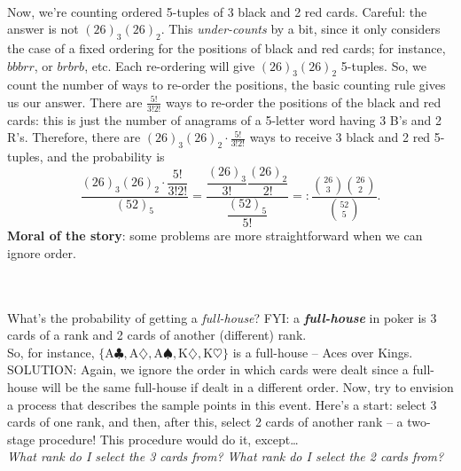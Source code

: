 \documentclass[12pt]{article}
\begin{document}
\\
\noindent Now, we're counting ordered 5-tuples of 3 black and 2 red cards.
Careful: the answer
is not $(26)_3(26)_2$.  This {\em under-counts} by a bit, since it only considers the case of a fixed ordering for the positions of black and red cards; for instance, $bbbrr$, or $brbrb$, etc.  Each re-ordering will give $(26)_3(26)_2$ 5-tuples. So, we count the number of ways to re-order the positions, the basic counting rule gives us our answer.
There are $\frac {5!}{3!2!}$ ways to re-order the positions of the black and red cards: this is just the number of anagrams of a 5-letter word having 3 B's and 2 R's.  Therefore, there are
$(26)_3 (26)_2\cdot \frac {5!}{3!2!}$ ways to receive 3 black and 2 red 5-tuples, and the probability is
$$\dfrac {(26)_3(26)_2\cdot \dfrac {5!}{3!2!}}{(52)_5} = \dfrac {\dfrac {(26)_3}{3!}\dfrac{(26)_2}{2!}}{\dfrac {(52)_5}{5!}} =: \dfrac {{26\choose 3}{26\choose 2}}{{52\choose 5}}.$$
{\bf Moral of the story}: some problems are more straightforward when we can ignore order.




\newpage






\\

\\
What's the probability of getting a {\em full-house}?   FYI: a {\bf\em full-house} in poker is 3 cards of a rank and 2 cards of another (different) rank.\\

\noindent So, for instance, $\{\mbox{A}\clubsuit,\mbox{A}\diamondsuit,\mbox{A}\spadesuit, \mbox{K}\diamondsuit,\mbox{K}\heartsuit\}$ is a full-house -- Aces over Kings.\\

\noindent SOLUTION: Again, we ignore the order in which cards were dealt since a full-house will be the same full-house if dealt in a different order.  Now, try to
envision a process that describes the sample points in this event.  Here's a start:
select 3 cards of one rank, and then, after this, select 2 cards of another rank -- a two-stage procedure! This procedure would do it, except\dots \\

{\em What rank do I select the 3 cards from?  What rank do I select the 2 cards from?}\\
\end{document}
